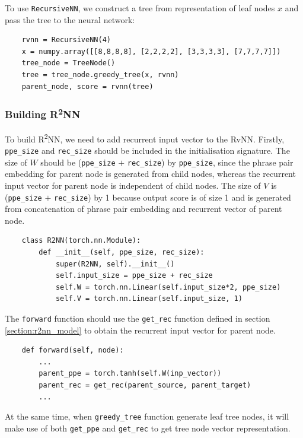 \documentclass[12pt,a4paper,twoside,openright]{report}
\begin{document}
To use \texttt{RecursiveNN}, we construct a tree from representation of leaf nodes $x$ and pass the tree to the neural network:

\begin{verbatim}
    rvnn = RecursiveNN(4)
    x = numpy.array([[8,8,8,8], [2,2,2,2], [3,3,3,3], [7,7,7,7]])
    tree_node = TreeNode()
    tree = tree_node.greedy_tree(x, rvnn)
    parent_node, score = rvnn(tree)
\end{verbatim}


\subsubsection{Building \texorpdfstring{R\textsuperscript{2}NN}{R2NN}}
To build R\textsuperscript{2}NN, we need to add recurrent input vector to the RvNN. Firstly, \texttt{ppe\_size} and \texttt{rec\_size} should be included in the initialisation signature. The size of $W$ should be (\texttt{ppe\_size} $+$ \texttt{rec\_size}) by \texttt{ppe\_size}, since the phrase pair embedding for parent node is generated from child nodes, whereas the recurrent input vector for parent node is independent of child nodes. The size of $V$ is (\texttt{ppe\_size} $+$ \texttt{rec\_size}) by 1 because output score is of size 1 and is generated from concatenation of phrase pair embedding and recurrent vector of parent node.

\begin{verbatim}
    class R2NN(torch.nn.Module):
        def __init__(self, ppe_size, rec_size):
            super(R2NN, self).__init__()
            self.input_size = ppe_size + rec_size
            self.W = torch.nn.Linear(self.input_size*2, ppe_size)
            self.V = torch.nn.Linear(self.input_size, 1)
\end{verbatim}

The \texttt{forward} function should use the \texttt{get\_rec} function defined in section \ref{section:r2nn_model} to obtain the recurrent input vector for parent node.

\begin{verbatim}
    def forward(self, node):
        ...
        parent_ppe = torch.tanh(self.W(inp_vector))
        parent_rec = get_rec(parent_source, parent_target)
        ...
\end{verbatim}

At the same time, when \texttt{greedy\_tree} function generate leaf tree nodes, it will make use of both \texttt{get\_ppe} and \texttt{get\_rec} to get tree node vector representation.
\end{document}
